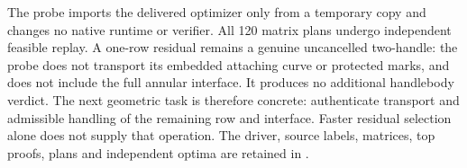 The probe imports the delivered optimizer only from a temporary copy and
changes no native runtime or verifier. All 120 matrix plans undergo
independent feasible replay. A one-row residual remains a genuine
uncancelled two-handle: the probe does not transport its embedded attaching
curve or protected marks, and does not include the full annular interface.
It produces no additional handlebody verdict. The next geometric task is
therefore concrete: authenticate transport and admissible handling of the
remaining row and interface. Faster residual selection alone does not
supply that operation. The driver, source labels, matrices, top proofs,
plans and independent optima are retained in
.
